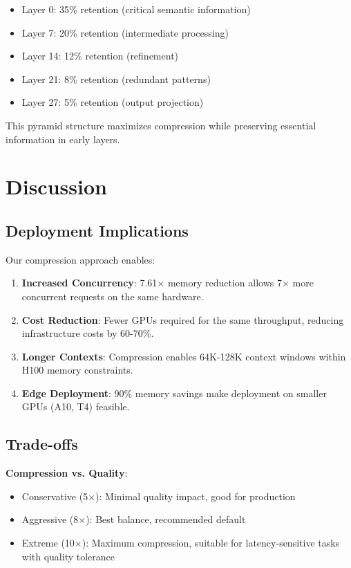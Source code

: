\documentclass{article}
\begin{document}
\begin{itemize}
\item Layer 0: 35\% retention (critical semantic information)
\item Layer 7: 20\% retention (intermediate processing)
\item Layer 14: 12\% retention (refinement)
\item Layer 21: 8\% retention (redundant patterns)
\item Layer 27: 5\% retention (output projection)
\end{itemize}

This pyramid structure maximizes compression while preserving essential information in early layers.

\section{Discussion}

\subsection{Deployment Implications}

Our compression approach enables:

\begin{enumerate}
\item \textbf{Increased Concurrency}: 7.61$\times$ memory reduction allows 7$\times$ more concurrent requests on the same hardware.

\item \textbf{Cost Reduction}: Fewer GPUs required for the same throughput, reducing infrastructure costs by 60-70\%.

\item \textbf{Longer Contexts}: Compression enables 64K-128K context windows within H100 memory constraints.

\item \textbf{Edge Deployment}: 90\% memory savings make deployment on smaller GPUs (A10, T4) feasible.
\end{enumerate}

\subsection{Trade-offs}

\textbf{Compression vs. Quality}:
\begin{itemize}
\item Conservative (5$\times$): Minimal quality impact, good for production
\item Aggressive (8$\times$): Best balance, recommended default
\item Extreme (10$\times$): Maximum compression, suitable for latency-sensitive tasks with quality tolerance
\end{itemize}
\end{document}
